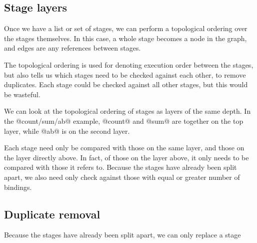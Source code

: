 \subsection{Stage layers}
Once we have a list or set of stages, we can perform a topological ordering over the stages themselves.
In this case, a whole stage becomes a node in the graph, and edges are any references between stages.

The topological ordering is used for denoting execution order between the stages, but also tells us which stages need to be checked against each other, to remove duplicates.
Each stage could be checked against all other stages, but this would be wasteful.

We can look at the topological ordering of stages as layers of the same depth.
In the @count/sum/ab@ example, @count@ and @sum@ are together on the top layer, while @ab@ is on the second layer.

Each stage need only be compared with those on the same layer, and those on the layer directly above.
In fact, of those on the layer above, it only needs to be compared with those it refers to.
Because the stages have already been split apart, we also need only check against those with equal or greater number of bindings.

\subsection{Duplicate removal}
Because the stages have already been split apart, we can only replace a stage 

